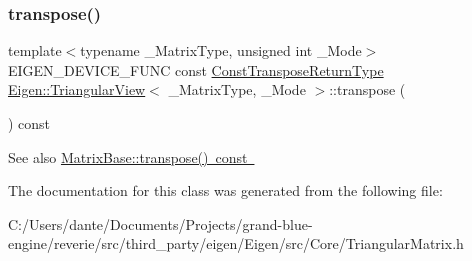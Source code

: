 \subsubsection{\texorpdfstring{transpose()}{transpose()}\hspace{0.1cm}{\footnotesize\ttfamily [2/2]}}
{\footnotesize\ttfamily template$<$typename \+\_\+\+Matrix\+Type, unsigned int \+\_\+\+Mode$>$ \\
E\+I\+G\+E\+N\+\_\+\+D\+E\+V\+I\+C\+E\+\_\+\+F\+U\+NC const \mbox{\hyperlink{class_eigen_1_1_triangular_view}{Const\+Transpose\+Return\+Type}} \mbox{\hyperlink{class_eigen_1_1_triangular_view}{Eigen\+::\+Triangular\+View}}$<$ \+\_\+\+Matrix\+Type, \+\_\+\+Mode $>$\+::transpose (\begin{DoxyParamCaption}{ }\end{DoxyParamCaption}) const\hspace{0.3cm}{\ttfamily [inline]}}

\begin{DoxySeeAlso}{See also}
\mbox{\hyperlink{class_eigen_1_1_dense_base_a38c0b074cf93fc194bf91141287cee3f}{Matrix\+Base\+::transpose() const }} 
\end{DoxySeeAlso}


The documentation for this class was generated from the following file\+:\begin{DoxyCompactItemize}
\item 
C\+:/\+Users/dante/\+Documents/\+Projects/grand-\/blue-\/engine/reverie/src/third\+\_\+party/eigen/\+Eigen/src/\+Core/Triangular\+Matrix.\+h\end{DoxyCompactItemize}
